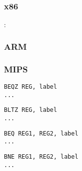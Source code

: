 \chapter{}
\label{sec:Jcc}






\section{\Conclusion{}}

\subsection{x86}

:



\ifdefined\IncludeARM

\subsection{ARM}


\fi

\ifdefined\IncludeMIPS

\subsection{MIPS}

\begin{lstlisting}[caption=\RU{Проверка на ноль}\EN{Check for zero}]
BEQZ REG, label
...
\end{lstlisting}

\begin{lstlisting}[caption=\RU{Меньше ли нуля?}\EN{Check for less than zero:}]
BLTZ REG, label
...
\end{lstlisting}

\begin{lstlisting}[caption=\RU{Проверка на равенство}\EN{Check for equal values}]
BEQ REG1, REG2, label
...
\end{lstlisting}

\begin{lstlisting}[caption=\RU{Проверка на неравенство}\EN{Check for non-equal values}]
BNE REG1, REG2, label
...
\end{lstlisting}

